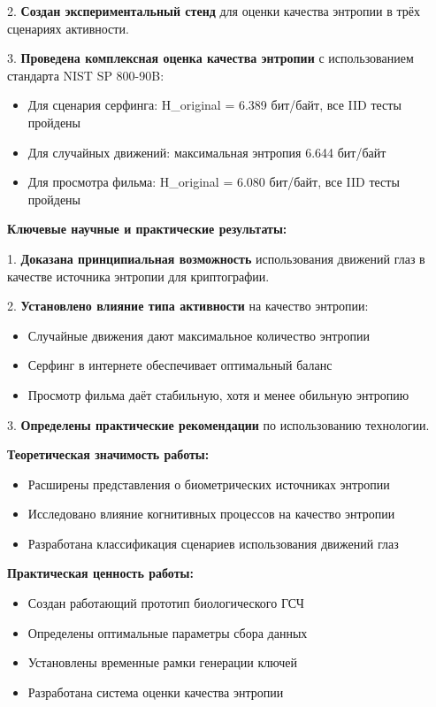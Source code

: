 \documentclass[14pt, a4paper]{extreport}
\begin{document}
2. \textbf{Создан экспериментальный стенд} для оценки качества энтропии в трёх сценариях активности.

3. \textbf{Проведена комплексная оценка качества энтропии} с использованием стандарта NIST SP 800-90B:
   \begin{itemize}
       \item Для сценария серфинга: H\_original = 6.389 бит/байт, все IID тесты пройдены
       \item Для случайных движений: максимальная энтропия 6.644 бит/байт
       \item Для просмотра фильма: H\_original = 6.080 бит/байт, все IID тесты пройдены
   \end{itemize}

\textbf{Ключевые научные и практические результаты:}

1. \textbf{Доказана принципиальная возможность} использования движений глаз в качестве источника энтропии для криптографии.

2. \textbf{Установлено влияние типа активности} на качество энтропии:
   \begin{itemize}
       \item Случайные движения дают максимальное количество энтропии
       \item Серфинг в интернете обеспечивает оптимальный баланс
       \item Просмотр фильма даёт стабильную, хотя и менее обильную энтропию
   \end{itemize}

3. \textbf{Определены практические рекомендации} по использованию технологии.

\textbf{Теоретическая значимость работы:}
\begin{itemize}
    \item Расширены представления о биометрических источниках энтропии
    \item Исследовано влияние когнитивных процессов на качество энтропии
    \item Разработана классификация сценариев использования движений глаз
\end{itemize}

\textbf{Практическая ценность работы:}
\begin{itemize}
    \item Создан работающий прототип биологического ГСЧ
    \item Определены оптимальные параметры сбора данных
    \item Установлены временные рамки генерации ключей
    \item Разработана система оценки качества энтропии
\end{itemize}
\end{document}

